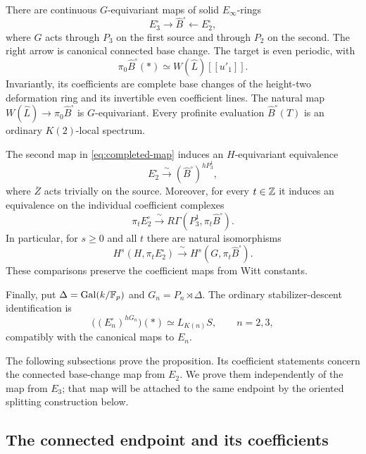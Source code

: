 \begin{proposition}
\label{prop:completed-theory}
There are continuous $G$-equivariant maps of solid $E_\infty$-rings
\begin{equation}\label{eq:completed-map}
 E_3^{\square}\longrightarrow\widehat B^{\square}
       \longleftarrow E_2^{\square},
\end{equation}
where $G$ acts through $P_3$ on the first source and through $P_2$ on
the second. The right arrow is canonical connected base change.
The target is even periodic, with
\[
 \pi_0\widehat B^{\square}(*)\simeq W(\widehat L)[[u'_1]].
\]
Invariantly, its coefficients are complete base changes of the
height-two deformation ring and its invertible even coefficient lines.
The natural map $W(\widehat L)\to\pi_0\widehat B^{\square}$ is
$G$-equivariant.  Every profinite evaluation
$\widehat B^{\square}(T)$ is an ordinary $K(2)$-local spectrum.

The second map in \eqref{eq:completed-map} induces an $H$-equivariant
equivalence
\[
 E_2^{\square}\xrightarrow{\ \sim\ }
       (\widehat B^{\square})^{hP_3^1},
\]
where $\overline Z$ acts trivially on the source.  Moreover, for every
$t\in\mathbb Z$ it induces an equivalence on the individual coefficient
complexes
\[
 \pi_tE_2^{\square}\xrightarrow{\ \sim\ }
       R\Gamma(P_3^1,\pi_t\widehat B^{\square}).
\]
In particular, for $s\ge0$ and all $t$ there are natural isomorphisms
\begin{equation}\label{eq:coefficient-descent}
 H^s(H,\pi_tE_2^{\square})
       \xrightarrow{\ \sim\ }
 H^s(G,\pi_t\widehat B^{\square}).
\end{equation}
These comparisons preserve the coefficient maps from Witt constants.

Finally, put $\Delta=\operatorname{Gal}(k/\mathbb F_p)$ and
$G_n=P_n\rtimes\Delta$.  The ordinary stabilizer-descent identification
is
\[
 \bigl((E_n^{\square})^{hG_n}\bigr)(*)\simeq L_{K(n)}S,
 \qquad n=2,3,
\]
compatibly with the canonical maps to $E_n$.
\end{proposition}

The following subsections prove the proposition. Its coefficient
statements concern the connected
base-change map from \(E_2\). We prove them independently of the map
from \(E_3\); that map will be attached to the same endpoint by the
oriented splitting construction below.

\subsection{The connected endpoint and its coefficients}

